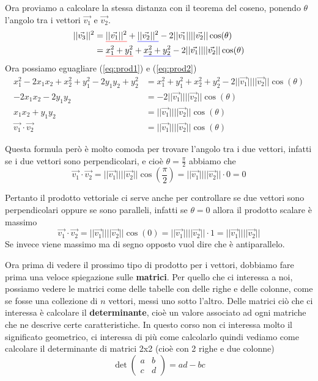 \documentclass{rapport}
\def\mathunderline#1#2{\color{#1}\underline{{\color{black}#2}}\color{black}}
\begin{document}
Ora proviamo a calcolare la stessa distanza con il teorema del coseno, ponendo $\theta$ l'angolo tra i vettori $\vec{v_1}$ e $\vec{v_2}$.
\begin{align}\label{eq:prod2}
||\vec{v_3}||^2 &= \mathunderline{red}{||\vec{v_1}||^2} + \mathunderline{blue}{||\vec{v_2}||^2} - 2||\vec{v_1}||||\vec{v_2}||\cos(\theta)\nonumber  \\
 &= \mathunderline{red}{x_1^2+y_1^2} + \mathunderline{blue}{x_2^2+y_2^2}  - 2||\vec{v_1}||||\vec{v_2}||\cos(\theta)  
\end{align}
Ora possiamo eguagliare (\ref{eq:prod1}) e (\ref{eq:prod2})
\begin{align*}
  x_1^2 -2x_1x_2 + x_2^2 + y_1^2-2y_1y_2 +y_2^2  &= x_1^2+y_1^2+x_2^2+y_2^2- 2||\vec{v_1}||||\vec{v_2}||\cos(\theta)  \\
   -2x_1x_2-2y_1y_2  &=- 2||\vec{v_1}||||\vec{v_2}||\cos(\theta)  \\
   x_1x_2+y_1y_2&= ||\vec{v_1}||||\vec{v_2}||\cos(\theta) \\
   \vec{v_1} \cdot \vec{v_2} &= ||\vec{v_1}||||\vec{v_2}||\cos(\theta)
\end{align*}

Questa formula però è molto comoda per trovare l'angolo tra i due vettori, infatti se i due vettori sono perpendicolari, e cioè $\theta = \frac{\pi}{2}$ abbiamo che 
\[
\vec{v_1} \cdot \vec{v_2} = ||\vec{v_1}||||\vec{v_2}||\cos\left(\dfrac{\pi}{2}\right) = ||\vec{v_1}||||\vec{v_2}||\cdot 0  = 0
\]

Pertanto il prodotto vettoriale ci serve anche per controllare se due vettori sono perpendicolari oppure se sono paralleli, infatti se $\theta = 0$ allora il prodotto scalare è massimo 
\[
\vec{v_1} \cdot \vec{v_2} = ||\vec{v_1}||||\vec{v_2}||\cos\left(0\right) = ||\vec{v_1}||||\vec{v_2}||\cdot 1  = ||\vec{v_1}||||\vec{v_2}||
\]
 Se invece viene massimo ma di segno opposto vuol dire che è antiparallelo.

 Ora prima di vedere il prossimo tipo di prodotto per i vettori, dobbiamo fare prima una veloce spiegazione sulle \textbf{matrici}. Per quello che ci interessa a noi, possiamo vedere le matrici come delle tabelle con delle righe e delle colonne, come se fosse una collezione di $n$ vettori, messi uno sotto l'altro. Delle matrici ciò che ci interessa è calcolare il \textbf{determinante}, cioè un valore associato ad ogni matriche che ne descrive certe caratteristiche. In questo corso non ci interessa molto il significato geometrico, ci interessa di più come calcolarlo quindi vediamo come calcolare il determinante di matrici 2x2 (cioè con 2 righe e due colonne)
 \[
 \det\begin{pmatrix}
  a & b \\
  c & d
 \end{pmatrix} = ad-bc
 \]
\end{document}
